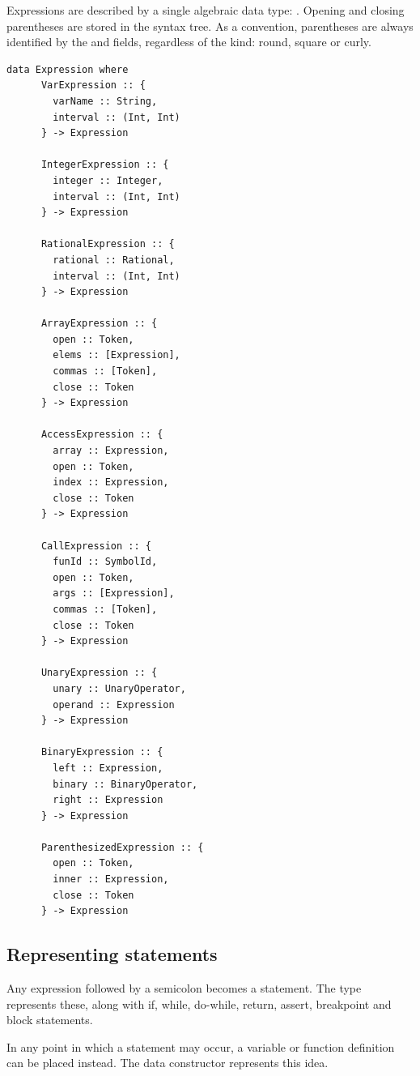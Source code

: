 \documentclass[UdineBachThesis,american,11pt]{PhdThesis}
\begin{document}
  Expressions are described by a single algebraic data type:
  \lstinline@Expression@. Opening and closing parentheses are stored in the
  syntax tree. As a convention, parentheses are always identified by the
  \lstinline@open@ and \lstinline@close@ fields, regardless of the kind:
  round, square or curly.

  \begin{lstlisting}[gobble=4,basicstyle=\ttfamily\small]
    data Expression where
      VarExpression :: {
        varName :: String,
        interval :: (Int, Int)
      } -> Expression

      IntegerExpression :: {
        integer :: Integer,
        interval :: (Int, Int)
      } -> Expression

      RationalExpression :: {
        rational :: Rational,
        interval :: (Int, Int)
      } -> Expression

      ArrayExpression :: {
        open :: Token,
        elems :: [Expression],
        commas :: [Token],
        close :: Token
      } -> Expression

      AccessExpression :: {
        array :: Expression,
        open :: Token,
        index :: Expression,
        close :: Token
      } -> Expression

      CallExpression :: {
        funId :: SymbolId,
        open :: Token,
        args :: [Expression],
        commas :: [Token],
        close :: Token
      } -> Expression

      UnaryExpression :: {
        unary :: UnaryOperator,
        operand :: Expression
      } -> Expression

      BinaryExpression :: {
        left :: Expression,
        binary :: BinaryOperator,
        right :: Expression
      } -> Expression

      ParenthesizedExpression :: {
        open :: Token,
        inner :: Expression,
        close :: Token
      } -> Expression
  \end{lstlisting}

  \subsection{Representing statements}

  Any expression followed by a semicolon becomes a statement. The type
  \lstinline@Statement@ represents these, along with if, while, do-while,
  return, assert, breakpoint and block statements.

  In any point in which a statement may occur, a variable or function definition
  can be placed instead. The data constructor \lstinline@DefinitionStatement@
  represents this idea.
\end{document}
